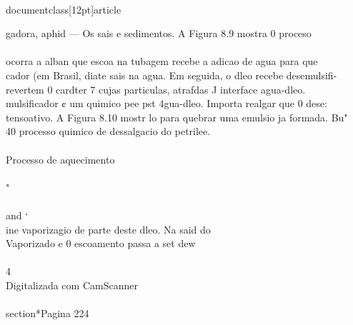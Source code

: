 \\documentclass[12pt]{article}
\begin{document}
{gadora, aphid — Os sais e sedimentos. A Figura 8.9 mostra 0 proceso\\
\\
ocorra a alban que escoa na tubagem recebe a adicao de agua para que\\
cador (em Brasil, diate sais na agua. Em seguida, o dleo recebe desemulsifi-\\
revertem 0 cardter 7 cujas particulas, atrafdas J interface agua-dleo.\\
mulsificador ¢ um quimico pee pst 4gua-dleo. Importa realgar que 0 dese:\\
tensoativo. A Figura 8.10 mostr lo para quebrar uma emulsio ja formada. Bu"\\
40 processo quimico de dessalgacio do petrilee.\\
\\
Processo de aquecimento\\
\\
"\\
\\
and ‘\\
ine vaporizagio de parte deste dleo. Na said do\\
Vaporizado e 0 escoamento passa a set dew\\
\\
4\\
Digitalizada com CamScanner\\

\\section*{Pagina 224}

}
\end{document}
